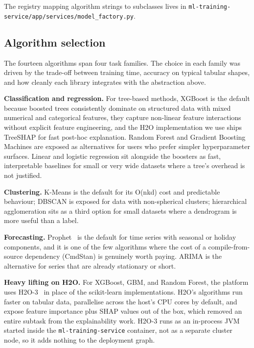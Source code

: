 \documentclass[12pt, a4paper, oneside]{report}
\begin{document}
The registry mapping algorithm strings to subclasses lives in
\texttt{ml-training-service/app/services/model\_factory.py}.

\subsection{Algorithm selection}

The fourteen algorithms span four task families. The choice in each
family was driven by the trade-off between training time, accuracy on
typical tabular shapes, and how cleanly each library integrates with
the abstraction above.

\textbf{Classification and regression.} For tree-based methods,
XGBoost is the default because boosted trees consistently dominate on
structured data with mixed numerical and categorical features, they capture non-linear feature interactions without explicit
feature engineering, and the H2O implementation we use ships
TreeSHAP for fast post-hoc explanation. Random Forest and Gradient
Boosting Machines are exposed as alternatives for users who prefer
simpler hyperparameter surfaces. Linear and logistic regression sit
alongside the boosters as fast, interpretable baselines for small or
very wide datasets where a tree's overhead is not justified.

\textbf{Clustering.} K-Means is the default for its O(nkd) cost and
predictable behaviour; DBSCAN is exposed for data with non-spherical
clusters; hierarchical agglomeration sits as a third option for
small datasets where a dendrogram is more useful than a label.

\textbf{Forecasting.} Prophet~\cite{prophet} is the default for time series with
seasonal or holiday components, and it is one of the few algorithms
where the cost of a compile-from-source dependency (CmdStan) is
genuinely worth paying. ARIMA is the alternative for series that are
already stationary or short.

\textbf{Heavy lifting on H2O.} For XGBoost, GBM, and Random Forest,
the platform uses H2O-3~\cite{h2o} in place of the scikit-learn implementations.
H2O's algorithms run faster on tabular data, parallelise across the
host's CPU cores by default, and expose feature importance plus SHAP
values out of the box, which removed an entire subtask from the
explainability work. H2O-3 runs as an in-process JVM started inside
the \texttt{ml-training-service} container, not as a separate cluster
node, so it adds nothing to the deployment graph.
\end{document}
